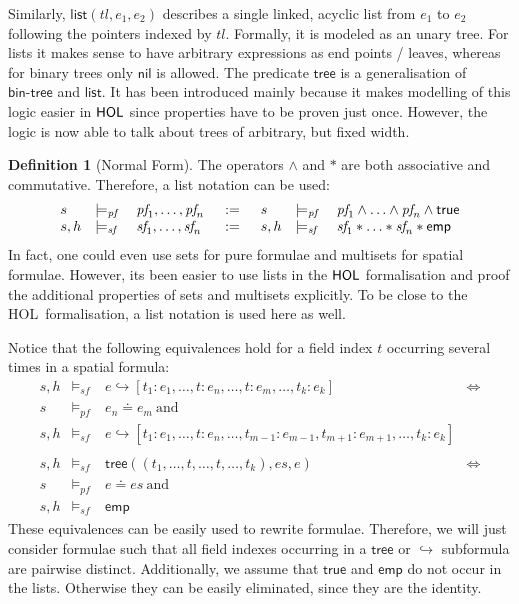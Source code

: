 \documentclass{scrartcl}
\theoremstyle{definition}
\newtheorem{definition}{Definition}
\newcommand{\HOL}{{\sf HOL}}
\newcommand{\nil}{{\textsf{nil}}}
\newcommand{\pftrue}{{\textsf{true}}}
\newcommand{\pfequal}[2]{\ensuremath{#1 \doteq #2}}
\newcommand{\modelspf}{{\models_{\textit{pf}}\ }}
\newcommand{\modelssf}{{\models_{\textit{sf}}\ }}
\newcommand{\sfemp}{{\textsf{emp}}}
\newcommand{\sftree}{{\textsf{tree}}}
\newcommand{\sfpointsto}[2]{#1 \hookrightarrow [#2]}
\newcommand{\sfbintree}{{\textsf{bin-tree}}}
\newcommand{\sflist}{{\textsf{list}}}
\newcommand{\varpf}[1]{\textit{pf}_{#1}}
\newcommand{\varsf}[1]{\textit{sf}_{#1}}
\begin{document}
Similarly, $\sflist (tl, e_1, e_2)$ describes a single linked, acyclic list
from $e_1$ to $e_2$ following the pointers indexed by $tl$. Formally, it is
modeled as an unary tree. For lists it makes
sense to have arbitrary expressions as end points / leaves, whereas for binary
trees only $\nil$ is allowed. The predicate $\sftree$ is a generalisation of
$\sfbintree$ and $\sflist$. It has been introduced mainly because it makes
modelling of this logic easier in $\HOL$ since properties have to be proven
just once. However, the logic is now able to talk about trees of arbitrary, but
fixed width.
\bigskip

\begin{definition}[Normal Form]
The operators $\wedge$ and $*$ are both associative and
commutative. Therefore, a list notation can be used:
%
\setlength{\arraycolsep}{2pt}
\[
\begin{array}{lll@{\hspace{15pt}}c@{\hspace{15pt}}lll}
   s & \modelspf & \varpf 1, \ldots, \varpf n & := & s & \modelspf & \varpf 1 \wedge \ldots \wedge
   \varpf n \wedge \pftrue \\
   s, h & \modelssf & \varsf 1, \ldots, \varsf n & := & s, h & \modelssf & \varsf 1 * \ldots *
   \varsf n * \sfemp
\end{array}
\]
%
In fact, one could even use sets for pure formulae and multisets for spatial
formulae. However, its been easier to use lists in the $\HOL$ formalisation
and proof the additional properties of sets and multisets explicitly.
To be close to the \HOL\ formalisation, a list notation is used here as well.

Notice that the following equivalences hold for a field index $t$
occurring several times in a spatial formula:
%
\[
\begin{array}{lllr}
s, h & \modelssf & \sfpointsto e {t_1:e_1, \ldots, t: e_n, \ldots, t:
  e_m, \ldots, t_k : e_k} & \Longleftrightarrow \\
s & \modelspf & \pfequal {e_n} {e_m}\ \text{and} \\
s, h & \modelssf & \sfpointsto e {t_1:e_1, \ldots, t: e_n, \ldots, t_{m-1}:
  e_{m-1}, t_{m+1}: e_{m+1}, \ldots, t_k : e_k} \\ \\

s, h & \modelssf & \sftree \left((t_1, \ldots, t, \ldots, t, \ldots,
  t_k),\textit{es},e\right) & \Longleftrightarrow \\
s & \modelspf & \pfequal {e} {\textit{es}}\ \text{and} \\
s, h & \modelssf & \sfemp
\end{array}
\]
%
These equivalences can be easily used to rewrite formulae. Therefore, we will
just consider formulae such that all field indexes occurring in a $\sftree$ or
$\hookrightarrow$ subformula are pairwise distinct. Additionally, we assume that
$\pftrue$ and $\sfemp$ do not occur in the lists. Otherwise they can be easily
eliminated, since they are the identity.


\end{definition}
\end{document}
